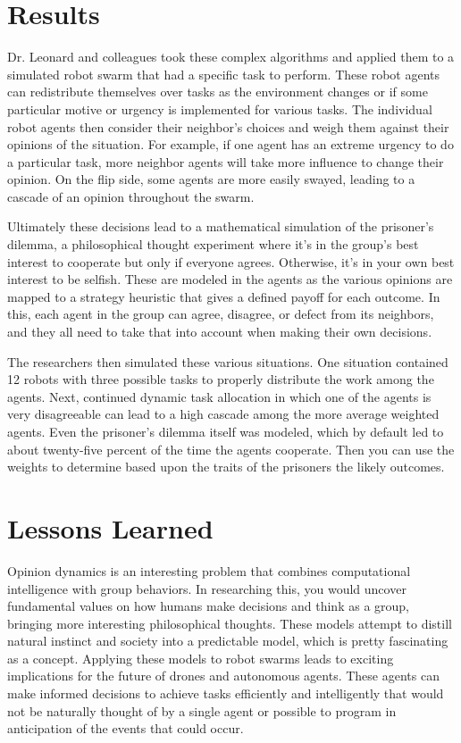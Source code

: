 \documentclass[journal,onecolumn]{IEEEtran}
\begin{document}
\section{Results}

Dr. Leonard and colleagues took these complex algorithms and applied them to a simulated robot swarm that had a specific task to perform. These robot agents can redistribute themselves over tasks as the environment changes or if some particular motive or urgency is implemented for various tasks. The individual robot agents then consider their neighbor's choices and weigh them against their opinions of the situation. For example, if one agent has an extreme urgency to do a particular task, more neighbor agents will take more influence to change their opinion. On the flip side, some agents are more easily swayed, leading to a cascade of an opinion throughout the swarm. 

Ultimately these decisions lead to a mathematical simulation of the prisoner's dilemma, a philosophical thought experiment where it's in the group's best interest to cooperate but only if everyone agrees. Otherwise, it's in your own best interest to be selfish. These are modeled in the agents as the various opinions are mapped to a strategy heuristic that gives a defined payoff for each outcome. In this, each agent in the group can agree, disagree, or defect from its neighbors, and they all need to take that into account when making their own decisions. 

The researchers then simulated these various situations. One situation contained 12 robots with three possible tasks to properly distribute the work among the agents. Next, continued dynamic task allocation in which one of the agents is very disagreeable can lead to a high cascade among the more average weighted agents. Even the prisoner's dilemma itself was modeled, which by default led to about twenty-five percent of the time the agents cooperate. Then you can use the weights to determine based upon the traits of the prisoners the likely outcomes. 

\section{Lessons Learned}

Opinion dynamics is an interesting problem that combines computational intelligence with group behaviors. In researching this, you would uncover fundamental values on how humans make decisions and think as a group, bringing more interesting philosophical thoughts. These models attempt to distill natural instinct and society into a predictable model, which is pretty fascinating as a concept. Applying these models to robot swarms leads to exciting implications for the future of drones and autonomous agents. These agents can make informed decisions to achieve tasks efficiently and intelligently that would not be naturally thought of by a single agent or possible to program in anticipation of the events that could occur. 
\end{document}
